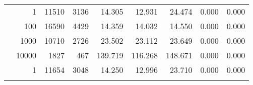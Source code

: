 \begin{table}
\begin{tabular}{rrrrrrrrr}
	            
	        
				\noalign{\smallskip}\hline
				\multirow{ 4 }{*}{ 80000 } &
				
					
					 
					\multirow{ 1 }{*}{ 1 } &
					
						
							    
							     11510  & 3136  
	                           & 14.305 & 12.931 & 24.474
	                           & 0.000 & 0.000  \\
	                
	            
					 &  
					 
					\multirow{ 1 }{*}{ 100 } &
					
						
							    
							     16590  & 4429  
	                           & 14.359 & 14.032 & 14.550
	                           & 0.000 & 0.000  \\
	                
	            
					 &  
					 
					\multirow{ 1 }{*}{ 1000 } &
					
						
							    
							     10710  & 2726  
	                           & 23.502 & 23.112 & 23.649
	                           & 0.000 & 0.000  \\
	                
	            
					 &  
					 
					\multirow{ 1 }{*}{ 10000 } &
					
						
							    
							     1827  & 467  
	                           & 139.719 & 116.268 & 148.671
	                           & 0.000 & 0.000  \\
	                
	            
	        
				\noalign{\smallskip}\hline
				\multirow{ 4 }{*}{ 160000 } &
				
					
					 
					\multirow{ 1 }{*}{ 1 } &
					
						
							    
							     11654  & 3048  
	                           & 14.250 & 12.996 & 23.710
	                           & 0.000 & 0.000  \\
	                
	            
					 &  
					 

\end{tabular}
\end{table}
